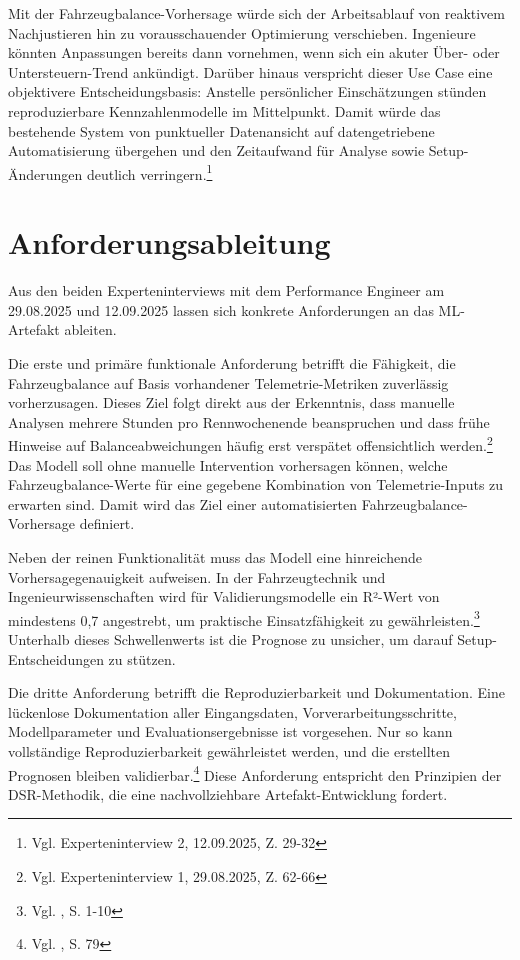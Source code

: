 Mit der Fahrzeugbalance-Vorhersage würde sich der Arbeitsablauf von reaktivem Nachjustieren hin zu vorausschauender Optimierung verschieben. Ingenieure könnten Anpassungen bereits dann vornehmen, wenn sich ein akuter Über- oder Untersteuern-Trend ankündigt. Darüber hinaus verspricht dieser Use Case eine objektivere Entscheidungsbasis: Anstelle persönlicher Einschätzungen stünden reproduzierbare Kennzahlenmodelle im Mittelpunkt. Damit würde das bestehende System von punktueller Datenansicht auf datengetriebene Automatisierung übergehen und den Zeitaufwand für Analyse sowie Setup-Änderungen deutlich verringern.\footnote{Vgl. Experteninterview 2, 12.09.2025, Z. 29-32}



\section{Anforderungsableitung}

Aus den beiden Experteninterviews mit dem Performance Engineer am 29.08.2025 und 12.09.2025 lassen sich konkrete Anforderungen an das \ac{ML}-Artefakt ableiten.

Die erste und primäre funktionale Anforderung betrifft die Fähigkeit, die Fahrzeugbalance auf Basis vorhandener Telemetrie-Metriken zuverlässig vorherzusagen. Dieses Ziel folgt direkt aus der Erkenntnis, dass manuelle Analysen mehrere Stunden pro Rennwochenende beanspruchen und dass frühe Hinweise auf Balanceabweichungen häufig erst verspätet offensichtlich werden.\footnote{Vgl. Experteninterview 1, 29.08.2025, Z. 62-66} Das Modell soll ohne manuelle Intervention vorhersagen können, welche Fahrzeugbalance-Werte für eine gegebene Kombination von Telemetrie-Inputs zu erwarten sind. Damit wird das Ziel einer automatisierten Fahrzeugbalance-Vorhersage definiert.

Neben der reinen Funktionalität muss das Modell eine hinreichende 
Vorhersagegenauigkeit aufweisen. In der Fahrzeugtechnik und 
Ingenieurwissenschaften wird für Validierungsmodelle ein R²-Wert 
von mindestens 0,7 angestrebt, um praktische Einsatzfähigkeit 
zu gewährleisten.\footnote{Vgl. \cite{ODonnell2024}, S. 1-10} 
Unterhalb dieses Schwellenwerts ist die Prognose zu unsicher, 
um darauf Setup-Entscheidungen zu stützen.

Die dritte Anforderung betrifft die Reproduzierbarkeit und Dokumentation. Eine lückenlose Dokumentation aller Eingangsdaten, Vorverarbeitungsschritte, Modellparameter und Evaluationsergebnisse ist vorgesehen. Nur so kann vollständige Reproduzierbarkeit gewährleistet werden, und die erstellten Prognosen bleiben validierbar.\footnote{Vgl. \cite{Venable2016}, S. 79} Diese Anforderung entspricht den Prinzipien der \ac{DSR}-Methodik, die eine nachvollziehbare Artefakt-Entwicklung fordert.

